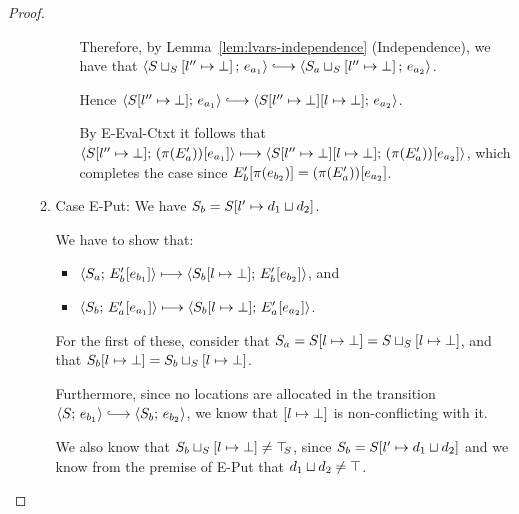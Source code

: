 \begin{proof}
\begin{enumerate}
\begin{enumerate}
\begin{itemize}
        Therefore, by Lemma~\ref{lem:lvars-independence}
        (Independence), we have that
        $\config{\lubstore{S}{\store{\storebindingRaw{l''}{\bot}}}}{e_{a_1}}
        \parstepsto
        \config{\lubstore{S_a}{\store{\storebindingRaw{l''}{\bot}}}}{e_{a_2}}$.

        Hence $\config{\extSRaw{S}{l''}{\bot}}{e_{a_1}} \parstepsto
        \config{\extSRaw{\extSRaw{S}{l''}{\bot}}{l}{\bot}}{e_{a_2}}$.

        By {\sc E-Eval-Ctxt} it follows that
        $\langle S[l'' \mapsto \bot];\, (\pi(E'_a))\hspace{-0.5mm}\left[e_{a_1}\right] \rangle
        \longmapsto
        \langle S[l'' \mapsto \bot][l \mapsto \bot];\, (\pi(E'_a))\hspace{-0.5mm}\left[e_{a_2}\right] \rangle$,
        which completes the case since $E'_b\hspace{-0.5mm}\left[\pi(e_{b_2})\right]
        = (\pi(E'_a))\hspace{-0.5mm}\left[e_{a_2}\right]$.


      \end{itemize}

    \item \label{lvars-slc-new-put}Case {\sc E-Put}: We have $S_b =
      S[l' \mapsto d_1 \sqcup d_2]$.

      We have to show that:
      \begin{itemize}
      \item $\langle S_a;\, E'_b\hspace{-0.5mm}\left[e_{b_1}\right] \rangle \longmapsto
        \langle S_b[l \mapsto \bot];\, E'_b\hspace{-0.5mm}\left[e_{b_2}\right] \rangle$,
        and
      \item $\langle S_b;\, E'_a\hspace{-0.5mm}\left[e_{a_1}\right] \rangle \longmapsto
        \langle S_b[l \mapsto \bot];\, E'_a\hspace{-0.5mm}\left[e_{a_2}\right] \rangle$.
      \end{itemize}

      For the first of these, consider that $S_a =
      S[l \mapsto \bot] =
      S \sqcup_{S} \left[ l \mapsto \bot \right]$, and that
      $S_b[l \mapsto \bot] =
      S_b \sqcup_{S} \left[ l \mapsto \bot \right]$.

      Furthermore, since no locations are allocated in the
      transition $\config{S}{e_{b_1}} \parstepsto
      \config{S_b}{e_{b_2}}$, we know that
      $\left[ l \mapsto \bot \right]$ is non-conflicting with it.

      We also know that
      $S_b \sqcup_{S} \left[ l \mapsto \bot \right] \neq \top\hspace{-0.85mm}_{S}$,
      since $S_b = S[l' \mapsto d_1 \sqcup d_2]$ and we know
      from the premise of {\sc E-Put} that $d_1 \sqcup d_2 \neq
      \top$.


\end{enumerate}
\end{enumerate}
\end{proof}
